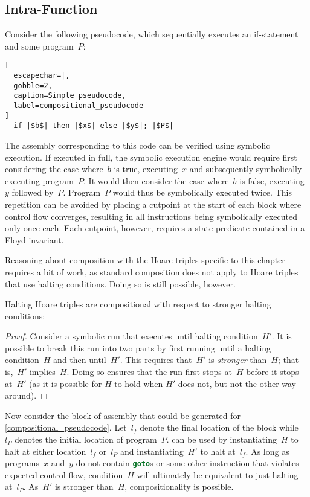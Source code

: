 \subsection{Intra-Function}
Consider the following pseudocode,
which sequentially executes an if-statement and some program~$P$:
\begin{lstlisting}[
  escapechar=|,
  gobble=2,
  caption=Simple pseudocode,
  label=compositional_pseudocode
]
  if |$b$| then |$x$| else |$y$|; |$P$|
\end{lstlisting}
The assembly corresponding to this code can be verified using symbolic execution.
If executed in full, the symbolic execution engine
would require first considering the case where~$b$ is true,
executing~$x$ and subsequently symbolically executing program~$P$.
It would then consider the case where~$b$ is false, executing~$y$ followed by~$P$.
Program~$P$ would thus be symbolically executed twice.
This repetition can be avoided
by placing a cutpoint at the start of each block where control flow converges,%
resulting in all instructions being symbolically executed only once each.
Each cutpoint, however, requires a state predicate contained in a Floyd invariant.

Reasoning about composition with the Hoare triples specific to this chapter
requires a bit of work,
as standard composition does not apply to Hoare triples
that use halting conditions.%
Doing so is still possible, however.
\begin{theorem}\label{thm:comp}
  Halting Hoare triples are compositional
  with respect to stronger halting conditions:
  \begin{prooftree}
  \end{prooftree}
\end{theorem}
\begin{proof}
  Consider a symbolic run that executes until halting condition~$H'$.
  It is possible to break this run into two parts
  by first running until a halting condition~$H$ and then until~$H'$.
  This requires that~$H'$ is \emph{stronger} than~$H$; that is,~$H'$ implies~$H$.
  Doing so ensures that the run first stops at~$H$ before it stops at~$H'$
  (as it is possible for $H$ to hold when $H'$ does not,
  but not the other way around).
\end{proof}
\begin{example}
  Now consider the block of assembly that could be generated for
  \cref{compositional_pseudocode}.
  Let~$l_f$ denote the final location of the block
  while~$l_P$ denotes the initial location of program~$P$.
   can be used by instantiating~$H$ to halt
  at either location~$l_f$ or~$l_P$ and instantiating~$H'$ to halt at~$l_f$.
  As long as programs~$x$ and~$y$ do not contain \lstinline[language=C]|goto|s
  or some other instruction that violates expected control flow,
  condition~$H$ will ultimately be equivalent to just halting at~$l_P$.
  As~$H'$ is stronger than~$H$, compositionality is possible.
\end{example}


